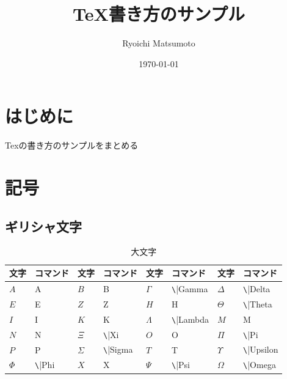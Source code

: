 \documentclass[11pt,a4paper]{jsarticle}
\title{TeX書き方のサンプル}
\author{Ryoichi Matsumoto}
\date{\today}
\begin{document}
\maketitle
%
%
\section{はじめに}
Texの書き方のサンプルをまとめる

\section{記号}

\subsection{ギリシャ文字}

\begin{table} [ h ]
\caption{大文字}
	\begin{center}
	\begin{tabular}{| l | l || l | l || l | l || l | l |} \hline
		文字 & コマンド & 文字 & コマンド & 文字 & コマンド & 文字 & コマンド \\ \hline
		$A$ & A & $B$ & B & $\Gamma$ & \verb|\|Gamma & $\Delta$ & \verb|\|Delta \\ \hline
		$E$ & E & $Z$ & Z & $H$ & H & $\Theta$ & \verb|\|Theta \\ \hline
		$I$ & I & $K$ & K & $\Lambda$ & \verb|\|Lambda & $M$ & M \\ \hline
		$N$ & N & $\Xi$ & \verb|\|Xi & $O$ & O & $\Pi$ & \verb|\|Pi \\ \hline
		$P$ & P & $\Sigma$ & \verb|\|Sigma & $T$ & T & $\Upsilon$ & \verb|\|Upsilon \\ \hline
		$\Phi$ & \verb|\|Phi & $X$ & X & $\Psi$ & \verb|\|Psi & $\Omega$ & \verb|\|Omega \\ \hline
	\end{tabular}
	\end{center}
\end{table}
\end{document}
